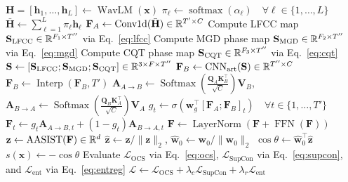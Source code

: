 \begin{algorithm}[t]
\caption{AuralGuard Multi-View Pipeline and Optimization}
\label{alg:auralguard}
\BlankLine
{}
$\mathbf{H} = [\mathbf{h}_1, \dots, \mathbf{h}_L] \leftarrow \operatorname{WavLM}(\mathbf{x})$ 
$\pi_\ell \leftarrow \operatorname{softmax}(\alpha_\ell) \quad \forall \ell \in \{1, \dots, L\}$ 
$\bar{\mathbf{H}} \leftarrow \sum_{\ell=1}^L \pi_\ell \mathbf{h}_\ell$\;
$\mathbf{F}_A \leftarrow \operatorname{Conv1d}(\bar{\mathbf{H}}) \in \mathbb{R}^{T' \times C}$\;
\BlankLine
{}
Compute LFCC map $\mathbf{S}_{\text{LFCC}} \in \mathbb{R}^{F_1 \times T''}$ via Eq.~\eqref{eq:lfcc}\;
Compute MGD phase map $\mathbf{S}_{\text{MGD}} \in \mathbb{R}^{F_2 \times T''}$ via Eq.~\eqref{eq:mgd}\;
Compute CQT phase map $\mathbf{S}_{\text{CQT}} \in \mathbb{R}^{F_3 \times T''}$ via Eq.~\eqref{eq:cqt}\;
$\mathbf{S} \leftarrow [\mathbf{S}_{\text{LFCC}}; \mathbf{S}_{\text{MGD}}; \mathbf{S}_{\text{CQT}}] \in \mathbb{R}^{3 \times F \times T''}$\;
$\mathbf{F}_B \leftarrow \operatorname{CNN}_{\text{art}}(\mathbf{S}) \in \mathbb{R}^{T'' \times C}$\;
\BlankLine
{}
$\mathbf{F}_B \leftarrow \operatorname{Interp}(\mathbf{F}_B, T')$ 
$\mathbf{A}_{A \to B} \leftarrow \operatorname{Softmax}\left(\frac{\mathbf{Q}_A \mathbf{K}_B^\top}{\sqrt{C}}\right) \mathbf{V}_B$, \quad $\mathbf{A}_{B \to A} \leftarrow \operatorname{Softmax}\left(\frac{\mathbf{Q}_B \mathbf{K}_A^\top}{\sqrt{C}}\right) \mathbf{V}_A$\;
$g_t \leftarrow \sigma\left(\mathbf{w}_g^\top [\mathbf{F}_A; \mathbf{F}_B]_t\right) \quad \forall t \in \{1, \dots, T'\}$\;
$\mathbf{F}_t \leftarrow g_t \mathbf{A}_{A \to B, t} + (1 - g_t) \mathbf{A}_{B \to A, t}$\;
$\mathbf{F} \leftarrow \operatorname{LayerNorm}(\mathbf{F} + \operatorname{FFN}(\mathbf{F}))$\;
\BlankLine
{}
$\mathbf{z} \leftarrow \operatorname{AASIST}(\mathbf{F}) \in \mathbb{R}^d$ 
$\hat{\mathbf{z}} \leftarrow \mathbf{z} / \|\mathbf{z}\|_2$, \quad $\hat{\mathbf{w}}_0 \leftarrow \mathbf{w}_0 / \|\mathbf{w}_0\|_2$\;
$\cos\theta \leftarrow \hat{\mathbf{w}}_0^\top \hat{\mathbf{z}}$\;
$s(\mathbf{x}) \leftarrow -\cos\theta$\;
\BlankLine
{}
Evaluate $\mathcal{L}_{\text{OCS}}$ via Eq.~\eqref{eq:ocs}, $\mathcal{L}_{\text{SupCon}}$ via Eq.~\eqref{eq:supcon}, and $\mathcal{L}_{\text{ent}}$ via Eq.~\eqref{eq:entreg}\;
$\mathcal{L} \leftarrow \mathcal{L}_{\text{OCS}} + \lambda_c \mathcal{L}_{\text{SupCon}} + \lambda_r \mathcal{L}_{\text{ent}}$\;
\end{algorithm}

